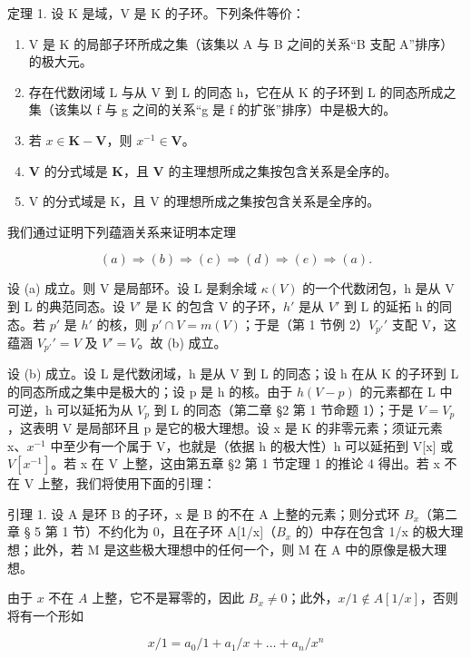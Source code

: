 定理 1. 设 K 是域，V 是 K 的子环。下列条件等价：

\begin{enumerate}
\def\labelenumi{(\alph{enumi})}
\item
  V 是 K 的局部子环所成之集（该集以 A 与 B 之间的关系“B 支配 A”排序）的极大元。
\item
  存在代数闭域 L 与从 V 到 L 的同态 h，它在从 K 的子环到 L 的同态所成之集（该集以 f 与 g 之间的关系“g 是 f 的扩张”排序）中是极大的。
\item
  若 \(x \in \mathbf{K} - \mathbf{V}\)，则 \(x^{-1} \in \mathbf{V}\)。
\item
  \(\mathbf{V}\) 的分式域是 \(\mathbf{K}\)，且 \(\mathbf{V}\) 的主理想所成之集按包含关系是全序的。
\item
  V 的分式域是 K，且 V 的理想所成之集按包含关系是全序的。
\end{enumerate}

我们通过证明下列蕴涵关系来证明本定理

\[
(a) \Rightarrow (b) \Rightarrow (c) \Rightarrow (d) \Rightarrow (e) \Rightarrow (a).
\]

设 (a) 成立。则 V 是局部环。设 L 是剩余域 \(\kappa(V)\) 的一个代数闭包，h 是从 V 到 L 的典范同态。设 \(V'\) 是 K 的包含 V 的子环，\(h'\) 是从 \(V'\) 到 L 的延拓 h 的同态。若 \(p'\) 是 \(h'\) 的核，则 \(p' \cap V = m(V)\)；于是（第 1 节例 2）\(V_{p'}'\) 支配 V，这蕴涵 \(V_{p'}' = V\) 及 \(V' = V\)。故 (b) 成立。

设 (b) 成立。设 L 是代数闭域，h 是从 V 到 L 的同态；设 h 在从 K 的子环到 L 的同态所成之集中是极大的；设 p 是 h 的核。由于 \(h(V - p)\) 的元素都在 L 中可逆，h 可以延拓为从 \(V_{p}\) 到 L 的同态（第二章 §2 第 1 节命题 1）；于是 \(V = V_{p}\)，这表明 V 是局部环且 p 是它的极大理想。设 x 是 K 的非零元素；须证元素 x、\(x^{-1}\) 中至少有一个属于 V，也就是（依据 h 的极大性）h 可以延拓到 V{[}x{]} 或 \(V[x^{-1}]\)。若 x 在 V 上整，这由第五章 §2 第 1 节定理 1 的推论 4 得出。若 x 不在 V 上整，我们将使用下面的引理：

引理 1. 设 A 是环 B 的子环，x 是 B 的不在 A 上整的元素；则分式环 \(B_{x}\)（第二章 § 5 第 1 节）不约化为 0，且在子环 A{[}1/x{]}（\(B_{x}\) 的）中存在包含 1/x 的极大理想；此外，若 M 是这些极大理想中的任何一个，则 M 在 A 中的原像是极大理想。

由于 \(x\) 不在 \(A\) 上整，它不是幂零的，因此 \(B_x \neq 0\)；此外，\(x / 1 \notin A[1 / x]\)，否则将有一个形如

\[
x / 1 = a _ {0} / 1 + a _ {1} / x + \dots + a _ {n} / x ^ {n}
\]

